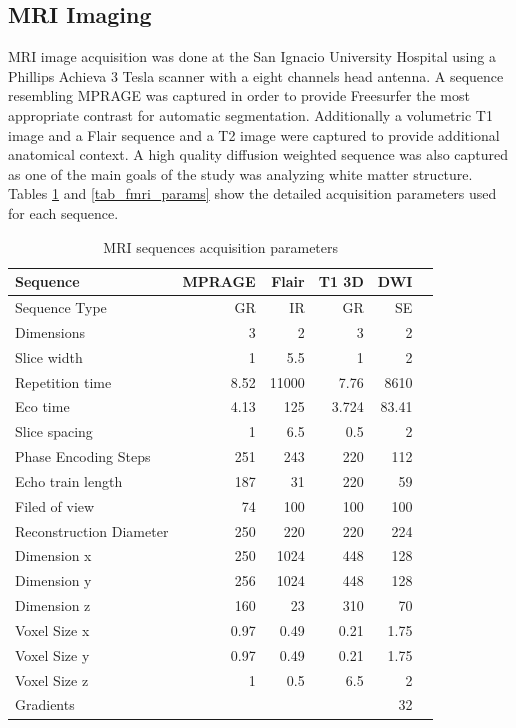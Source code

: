 \subsection{MRI Imaging}



MRI image acquisition was done at the San Ignacio University Hospital using a Phillips Achieva 3 Tesla scanner with a eight channels head  antenna. A sequence resembling MPRAGE was captured in order to provide Freesurfer the most appropriate contrast for automatic segmentation. Additionally a volumetric T1 image and a Flair sequence and a T2 image were captured to provide additional anatomical context. A high quality diffusion weighted sequence was also captured as one of the main goals of the study was analyzing white matter structure. Tables \ref{tab_mri_params} and \ref{tab_fmri_params} show the detailed acquisition parameters used for each sequence. 
\begin{table}
	\centering
	\footnotesize
		\begin{tabular}{lrrrrr}
				\toprule
				Sequence&MPRAGE	&Flair	&T1 3D &DWI\\ 
				\midrule
				Sequence Type	&GR	&IR	&GR &SE\\ 
				Dimensions	&3	&2	&3 &2\\
				Slice width	&1	&5.5	&1 &2\\
				Repetition time	&8.52	&11000	&7.76 &8610\\
				Eco time	&4.13	&125	&3.724 &83.41\\
				Slice spacing	&1	&6.5	&0.5 &2\\
				Phase Encoding Steps	&251	&243	&220 &112\\
				Echo train length	&187	&31	&220 &59\\
				Filed of view	&74	&100	&100 &100\\
				Reconstruction	Diameter&250	&220	&220 &224\\ \addlinespace
				Dimension x &250	&1024 &448  &128 \\
				Dimension y &256	&1024 &448 &128 \\
				Dimension z &160	&23 &310 &70 \\ \addlinespace
				Voxel Size x	&0.97 &0.49 &0.21  &1.75 \\
				Voxel Size y	&0.97 &0.49 &0.21 &1.75 \\
				Voxel Size z	&1  &0.5 &6.5 &2 \\ \addlinespace
				Gradients   &    &    &    &    32 \\
				\bottomrule
		\end{tabular}
	\caption{MRI sequences acquisition parameters}
	\label{tab_mri_params}
\end{table}



